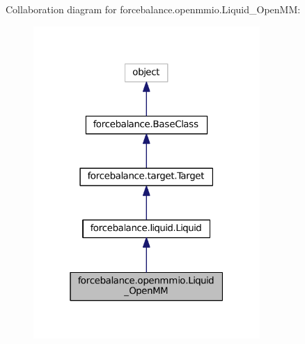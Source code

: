 Collaboration diagram for forcebalance.\-openmmio.\-Liquid\-\_\-\-Open\-M\-M\-:
\nopagebreak
\begin{figure}[H]
\begin{center}
\leavevmode
\includegraphics[width=244pt]{classforcebalance_1_1openmmio_1_1Liquid__OpenMM__coll__graph}
\end{center}
\end{figure}
